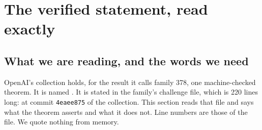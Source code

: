 \section{The verified statement, read exactly}
\label{sec:statement}
\begingroup\sloppy

\subsection{What we are reading, and the words we need}
\label{sec:statement-words}

OpenAI's collection \citep{OAI:The-Exponential-Time-Hypothesis-is-False-October-25-2026}
holds, for the result it calls family 378, one machine-checked theorem.
It is named . It is stated in the family's
challenge file, which is 220 lines long:
 at commit
\texttt{4eaee875} of the collection. This section reads that
file and says what the theorem asserts and what it does not. Line
numbers are those of the file. We quote nothing from memory.

